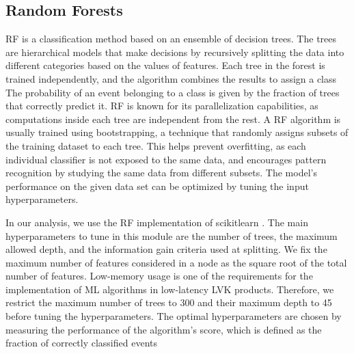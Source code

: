 \subsection*{Random Forests}

\ac{RF} is a classification method based on an ensemble of decision trees. The trees are hierarchical models that make decisions by recursively splitting the data into different
categories based on the values of features. Each tree in the forest is trained independently, and the algorithm combines the results to assign a class  The probability of an event belonging to a class is given by the fraction of trees that
correctly predict it. \ac{RF} is known for its parallelization capabilities, as computations inside each tree are independent from the rest. A \ac{RF} algorithm is usually trained using
bootstrapping, a technique that randomly assigns subsets of the training dataset to each tree. This helps prevent overfitting, as each individual classifier is not exposed to the same
data, and encourages pattern recognition by studying the same data from different subsets. The model's performance on the given data set can be optimized by tuning the input
hyperparameters.

In our analysis, we use the \ac{RF} implementation of scikitlearn \cite{Pedregosa:2011}. The main hyperparameters to tune in this module are the number of trees, the maximum allowed depth, and the information gain criteria used at splitting.  We fix the maximum number of features considered in a node  as the square root of the total number of features. Low-memory usage is one of the requirements for the implementation of \ac{ML} algorithms in low-latency \ac{LVK} products. Therefore, we restrict the maximum number of trees to 300 and their maximum depth to 45 before tuning the hyperparameters. The optimal hyperparameters are chosen by measuring the performance of the algorithm's score, which is defined as the fraction of correctly classified events 


 



